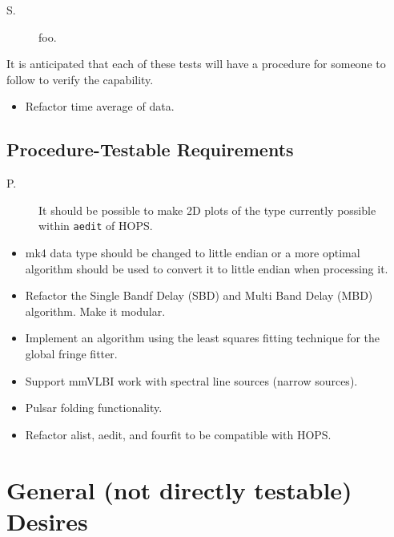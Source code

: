 \begin{description}
\item[S.\thereq] foo.
\end{description}

It is anticipated that each of these tests will have a procedure
for someone to follow to verify the capability.

\begin{itemize}
\item Refactor time average of data.
\end{itemize}

\subsection{Procedure-Testable Requirements}
\label{sec:procedure}

\begin{description}
\item[P.\thereq] It should be possible to make 2D plots of the type
currently possible within \texttt{\ac{aedit}} of \ac{HOPS}.
\end{description}

\begin{itemize}
\item mk4 data type should be changed to little endian or a more optimal algorithm should be used to convert it to little endian when processing it.
\item Refactor the Single Bandf Delay (SBD) and Multi Band Delay (MBD) algorithm. Make it modular.
\item Implement an algorithm using the least squares fitting technique for the global fringe fitter.
\item Support mmVLBI work with spectral line sources (narrow sources).
\item Pulsar folding functionality.
\item Refactor alist, aedit, and fourfit to be compatible with \ac{HOPS}.
\end{itemize}

\section{General (not directly testable) Desires}
\label{sec:desires}

